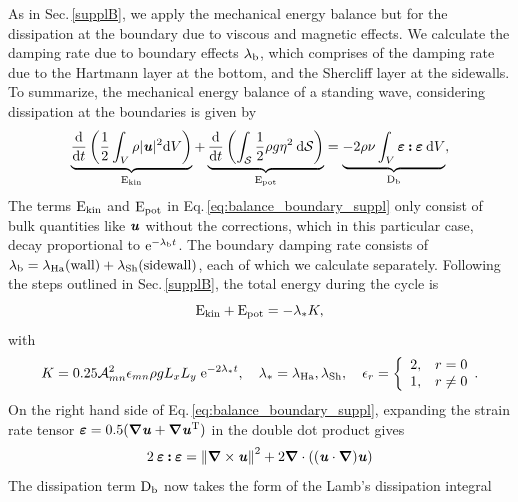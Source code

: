 \documentclass[aps,prfluids,reprint,superscriptaddress]{revtex4-2}
\newcommand{\h}[1]{\textbf{\textit{#1}}}
\newcommand{\ii}[1]{\text{#1}}
\numberwithin{equation}{section}
\begin{document}
As in Sec.\,\ref{supplB}, we apply the mechanical energy balance but for the dissipation at the boundary due to viscous and magnetic effects. We calculate the damping rate due to boundary effects $\lambda_{\rm b}$, which comprises of the damping rate due to the Hartmann layer at the bottom, and the Shercliff layer at the sidewalls. To summarize, the mechanical energy balance of a standing wave, considering dissipation at the boundaries is given by
\begin{equation}
	\underbrace{
	\dv{}{t}\left(  \frac{1}{2} 
	\int_{V} \rho |\h u|^2 \mathrm dV  \right)
}_{\ii E_{\rm kin}}
	+
	\underbrace{
	\dv{}{t}\left( \int_{\mathcal{S}} 
	\frac{1}{2} \rho g\eta^2  \: \mathrm d\mathcal{S}  
	\right)
}_{\ii E_{\rm pot}}
	= 
	\underbrace{
	- 2\rho\nu
	\int_{V} \bm\varepsilon \bm{\mathbin{:}} \bm\varepsilon  \: \mathrm dV
}_{\ii D_{\rm b}} ,
	\label{eq:balance_boundary_suppl}
\end{equation}
The terms $\ii E_{\rm kin}$ and $\ii E_{\rm pot}$ in Eq.\,\eqref{eq:balance_boundary_suppl} only consist of bulk quantities like $\h u$ without the corrections, which in this particular case, decay proportional to $\ii e^{-\lambda_{\rm b} t}$. The boundary damping rate consists of $\lambda_{\rm b} = \lambda_{\rm Ha}(\ii{wall}) + \lambda_{\rm Sh}(\ii{sidewall})$, each of which we calculate separately. Following the steps outlined in Sec.\,\ref{supplB}, the total energy during the cycle is
\begin{equation}
	\ii E_{\rm kin} + \ii E_{\rm pot} = -\lambda_* K,
	\label{eq:ekin_epot_k}
\end{equation}
with 
\begin{equation}
	K = 0.25\mathcal{A}^2_{mn}\epsilon_{mn}\rho g L_xL_y
	\;\ii e^{-2\lambda_*t} ,
	\quad 
	\lambda_* = \lambda_{\rm Ha}, \lambda_{\rm Sh}, \quad
	\epsilon_{r} =
	\biggl\{ \begin{array}{rc}
		2,  & r= 0 \\
		1,  & r\neq 0
	\end{array} .
\end{equation}
On the right hand side of Eq.\,\eqref{eq:balance_boundary_suppl}, expanding the strain rate tensor $\bm\varepsilon = 0.5(\bm\nabla\h u + \bm\nabla\h u^{\rm T})$ in the double dot product gives
\begin{equation}
	2 \: \bm\varepsilon \bm{\mathbin{:}} \bm\varepsilon = 
	\norm{\bm\nabla \times \h u}^2 +
	2\bm\nabla \cdot \left( (\h u \cdot \bm\nabla )\h u\right)
\end{equation} 
The dissipation term $\ii D_{\rm b}$ now takes the form of the Lamb's dissipation integral
\end{document}
